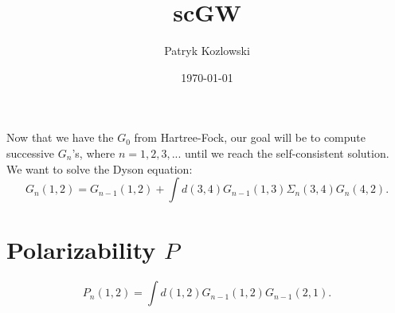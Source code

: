\documentclass[12pt]{article}
\title{scGW}
\author{Patryk Kozlowski}
\date{\today}
\begin{document}
\maketitle
Now that we have the  $G_0$ from Hartree-Fock, our goal will be to compute successive $G_n$'s, where $n=1,2,3,...$ until we reach the self-consistent solution. We want to solve the Dyson equation:
\begin{equation}
    G_n(1,2)=G_{n-1}(1,2)+\int d(3,4) G_{n-1}(1,3) \Sigma_n(3,4) G_n(4,2).
\end{equation}
\section{Polarizability $P$}
\begin{equation}
    P_n(1,2)=\int d(1,2) G_{n-1}(1,2) G_{n-1}(2,1).
\end{equation}
\end{document}
